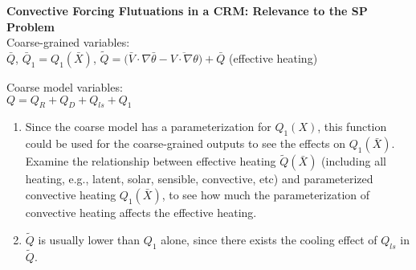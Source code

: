 \documentclass[margin=0.5in,twocolumn,12pt]{article}
\begin{document}
{\bf{Convective Forcing Flutuations in a CRM: Relevance to the SP Problem}} \\
Coarse-grained variables: \\
$\bar{Q}$, $\bar{Q}_1 = Q_1(\bar{X})$, $\tilde{Q} = \Big(\bar{V}\cdot\nabla\bar{\theta} - \overline{V\cdot\nabla\theta}\Big) + \bar{Q}$ (effective heating)

Coarse model variables: \\
$Q = Q_R + Q_D + Q_{ls} + Q_1$ \\

\begin{enumerate}
\item Since the coarse model has a parameterization for $Q_1(X)$, this function could be used for the coarse-grained outputs to see the effects on $Q_1(\bar{X})$.
Examine the relationship between effective heating  $\tilde{Q}(\bar{X})$ (including all heating, e.g., latent, solar, sensible, convective, etc) and parameterized convective heating $Q_1(\bar{X})$, to see how much the parameterization of convective heating affects the effective heating.

\item $\tilde{Q}$ is usually lower than $Q_1$ alone, since there exists the cooling effect of $Q_{ls}$ in $\tilde{Q}$. 
\end{enumerate}
\end{document}
